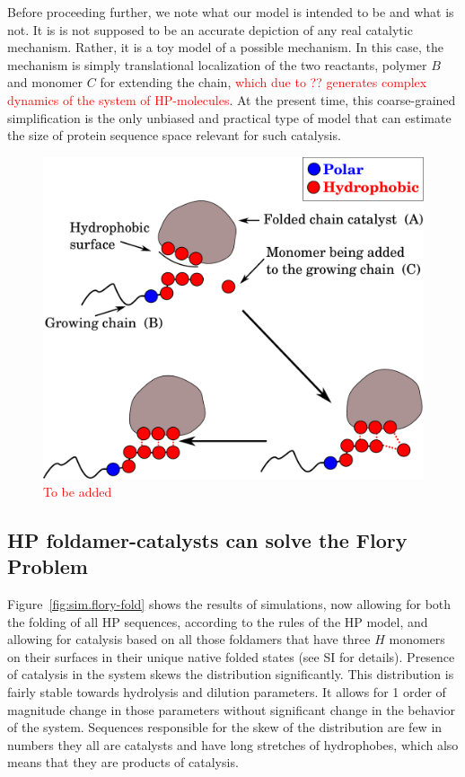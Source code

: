 \documentclass[journal=jacsat,manuscript=article,layout=twocolumn]{achemso}
\newcommand*{\red}[1]{\textcolor{red}{#1}}
\begin{document}
Before proceeding further, we note what our model is intended to be and what is not.  It is is not 
supposed to be an accurate depiction of any real catalytic mechanism.  Rather, it is a toy 
model of a possible mechanism.  In this case, the mechanism is simply translational 
localization of the two reactants, polymer $B$ and monomer $C$ for extending the chain, \red{which 
due to ?? generates complex dynamics of the system of HP-molecules}.  At the 
present time, this coarse-grained simplification is the only unbiased and practical type of model 
that can estimate the size of protein sequence space relevant for such catalysis.
\begin{figure}[h!]
  \centering
  \includegraphics[width=0.9\columnwidth]{pictures/hp-catalysis.pdf} 
  \caption{\red{To be added}}
  \label{fig:hp-catalysis}
\end{figure}


\subsection{HP foldamer-catalysts can solve the Flory Problem}

Figure~\ref{fig:sim.flory-fold} shows the results of simulations, now allowing for both the folding 
of all HP sequences, according to the rules of the HP model, and allowing for catalysis based on all 
those foldamers that have three $H$ monomers on their surfaces in their unique native folded states 
(see SI for details). 
Presence of catalysis in the system skews the
distribution significantly. This distribution is fairly stable towards hydrolysis and dilution
parameters. It allows for 1 order of magnitude change in those parameters without significant change 
in the behavior of the system.
Sequences responsible for the skew of the distribution are few in numbers they all are catalysts
and have long stretches of hydrophobes, which also means that they are products of catalysis. 
\end{document}
